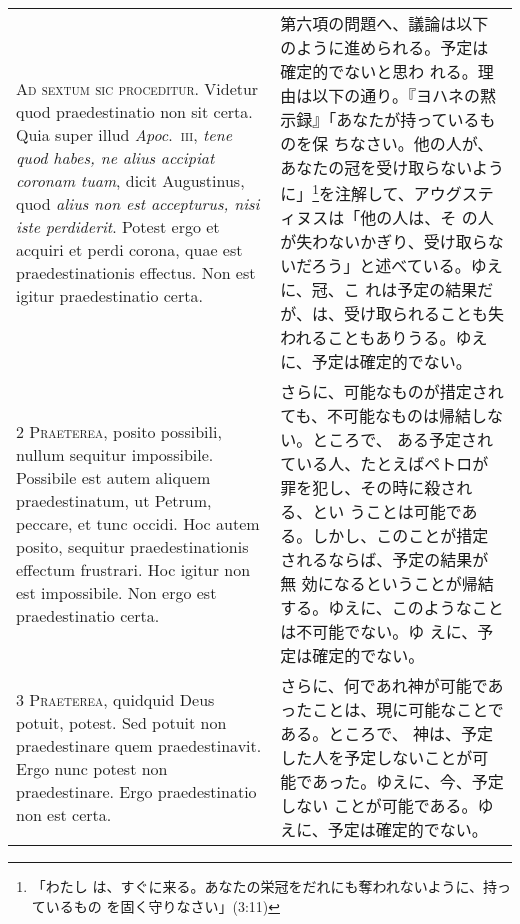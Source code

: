 \documentclass[10pt]{jsarticle} %
\begin{document}
\begin{longtable}{p{21em}p{21em}}



{\Huge A}{\scshape d sextum sic proceditur}. Videtur quod
praedestinatio non sit certa. Quia super illud {\itshape Apoc}.~{\scshape iii}, {\itshape tene quod
habes, ne alius accipiat coronam tuam}, dicit Augustinus, quod {\itshape alius non
est accepturus, nisi iste perdiderit}. Potest ergo et acquiri et perdi
corona, quae est praedestinationis effectus. Non est igitur
praedestinatio certa.


&

第六項の問題へ、議論は以下のように進められる。予定は確定的でないと思わ
れる。理由は以下の通り。『ヨハネの黙示録』「あなたが持っているものを保
ちなさい。他の人が、あなたの冠を受け取らないように」\footnote{「わたし
は、すぐに来る。あなたの栄冠をだれにも奪われないように、持っているもの
を固く守りなさい」(3:11)}を注解して、アウグスティヌスは「他の人は、そ
の人が失わないかぎり、受け取らないだろう」と述べている。ゆえに、冠、こ
れは予定の結果だが、は、受け取られることも失われることもありうる。ゆえ
に、予定は確定的でない。


\\


{\scshape 2 Praeterea}, posito possibili, nullum
sequitur impossibile. Possibile est autem aliquem praedestinatum, ut
Petrum, peccare, et tunc occidi. Hoc autem posito, sequitur
praedestinationis effectum frustrari. Hoc igitur non est
impossibile. Non ergo est praedestinatio certa.


&


さらに、可能なものが措定されても、不可能なものは帰結しない。ところで、
ある予定されている人、たとえばペトロが罪を犯し、その時に殺される、とい
うことは可能である。しかし、このことが措定されるならば、予定の結果が無
効になるということが帰結する。ゆえに、このようなことは不可能でない。ゆ
えに、予定は確定的でない。

\\


{\scshape 3 Praeterea}, quidquid Deus potuit,
potest. Sed potuit non praedestinare quem praedestinavit. Ergo nunc
potest non praedestinare. Ergo praedestinatio non est certa.


&

さらに、何であれ神が可能であったことは、現に可能なことである。ところで、
神は、予定した人を予定しないことが可能であった。ゆえに、今、予定しない
ことが可能である。ゆえに、予定は確定的でない。

\\



\end{longtable}
\end{document}
